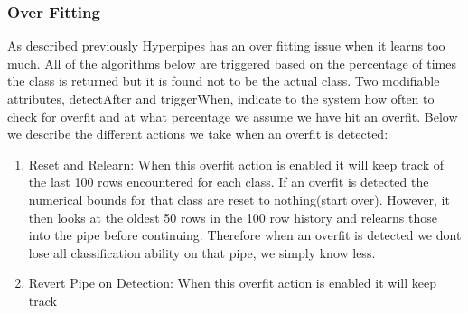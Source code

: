 \subsubsection{Over Fitting}
As described previously Hyperpipes has an over fitting issue 
when it learns too much. All of the algorithms below are triggered 
based on the percentage of times the class is returned but it is 
found not to be the actual class. Two modifiable attributes, detectAfter
and triggerWhen, indicate to the system how often to check for 
overfit and at what percentage we assume we have hit an overfit. 
Below we describe the different actions we take when an overfit
is detected:
\begin{enumerate}
\item Reset and Relearn: 
	When this overfit action is enabled it will keep track of the 
	last 100 rows encountered for each class. If an overfit is detected 
	the numerical bounds for that class are reset to nothing(start over).
	However, it then looks at the oldest 50 rows in the 100 row history 
	and relearns those into the pipe before continuing. Therefore when
	an overfit is detected we dont lose all classification ability on that
	pipe, we simply know less.
\item Revert Pipe on Detection:
	When this overfit action is enabled it will keep track
	
\end{enumerate}


